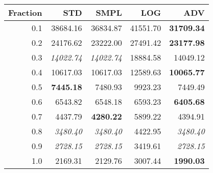 \documentclass{standalone}
\begin{document}
\begin{tabular}{r|rrrr}
      \toprule
      Fraction & STD & SMPL & LOG & ADV\\
      \midrule
      0.1 & 38684.16 & 36834.87 & 41551.70 & \textbf{31709.34}\\
  0.2 & 24176.62 & 23222.00 & 27491.42 & \textbf{23177.98}\\
  0.3 & \emph{14022.74} & \emph{14022.74} & 18884.58 & 14049.12\\
  0.4 & 10617.03 & 10617.03 & 12589.63 & \textbf{10065.77}\\
  0.5 & \textbf{7445.18} & 7480.93 & 9923.23 & 7449.49\\
  0.6 & 6543.82 & 6548.18 & 6593.23 & \textbf{6405.68}\\
  0.7 & 4437.79 & \textbf{4280.22} & 5899.22 & 4394.91\\
  0.8 & \emph{3480.40} & \emph{3480.40} & 4422.95 & \emph{3480.40}\\
  0.9 & \emph{2728.15} & \emph{2728.15} & 3419.61 & \emph{2728.15}\\
  1.0 & 2169.31 & 2129.76 & 3007.44 & \textbf{1990.03}\\
  \bottomrule
\end{tabular}
\end{document}
